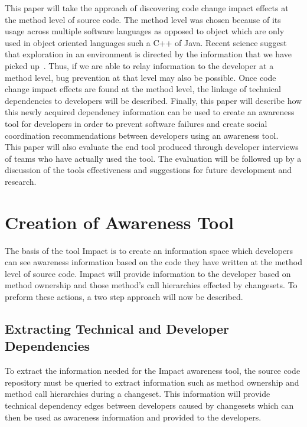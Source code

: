 \documentclass[conference]{IEEEtran}
\begin{document}
This paper will take the approach of discovering code change impact effects at the method
level of source code. The method level was chosen because of its usage across multiple
software languages as opposed to object which are only used in object oriented languages
such a C++ of Java.  Recent science suggest that exploration in an environment
is directed by the information that we have picked up~\cite{Neisser:1974:USE}. Thus, if we are able to relay
information to the developer at a method level, bug prevention at that level may
also be possible. Once code change impact effects are found at the method level, the 
linkage of technical dependencies to developers will be described. Finally, this paper will
describe how this newly acquired dependency information can be used to create an awareness
tool for developers in order to prevent software failures and create social coordination
recommendations between developers using an awareness tool.\\

This paper will also evaluate the end tool produced through developer interviews of teams
who have actually used the tool.  The evaluation will be followed up by a discussion of
the tools effectiveness and suggestions for future development and research.\\


\section{Creation of Awareness Tool}

The basis of the tool Impact is to create an information space which developers can see awareness information
based on the code they have written at the method level of source code. Impact will provide information to the
developer based on method ownership and those method's call hierarchies effected by changesets.  To preform
these actions, a two step approach will now be described. \\

\subsection{Extracting Technical and Developer Dependencies}
To extract the information needed for the Impact awareness tool, the source code repository must be queried to
extract information such as method ownership and method call hierarchies during a changeset. This information
will provide technical dependency edges between developers caused by changesets which can then be used as
awareness information and provided to the developers. \\
\end{document}
